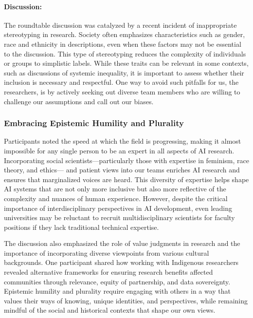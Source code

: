 \paragraph{Discussion:}
The roundtable discussion was catalyzed by a recent incident of inappropriate stereotyping in research. Society often emphasizes characteristics such as gender, race and ethnicity in descriptions, even when these factors may not be essential to the discussion. This type of stereotyping reduces the complexity of individuals or groups to simplistic labels. While these traits can be relevant in some contexts, such as discussions of systemic inequality, it is important to assess whether their inclusion is necessary and respectful. One way to avoid such pitfalls for us, the researchers, is by actively seeking out diverse team members who are willing to challenge our assumptions and call out our biases. 

\subsubsection{Embracing Epistemic Humility and Plurality}
Participants noted the speed at which the field is progressing, making it almost impossible for any single person to be an expert in all aspects of AI research. Incorporating social scientists—particularly those with expertise in feminism, race theory, and ethics— and patient views into our teams enriches AI research and ensures that marginalized voices are heard. This diversity of expertise helps shape AI systems that are not only more inclusive but also more reflective of the complexity and nuances of human experience. However, despite the critical importance of interdisciplinary perspectives in AI development, even leading universities may be reluctant to recruit multidisciplinary scientists for faculty positions if they lack traditional technical expertise.

The discussion also emphasized the role of value judgments in research and the importance of incorporating diverse viewpoints from various cultural backgrounds. One participant shared how working with Indigenous researchers revealed alternative frameworks for ensuring research benefits affected communities through relevance, equity of partnership, and data sovereignty. Epistemic humility and plurality require engaging with others in a way that values their ways of knowing, unique identities, and perspectives, while remaining mindful of the social and historical contexts that shape our own views.

